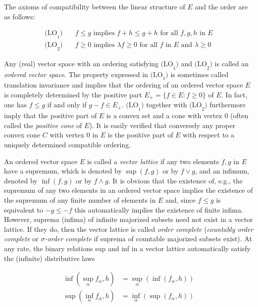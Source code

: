 The axioms of compatibility between the linear structure of $ E $ and the order are as follows:

\begin{align*}
\text{(LO}_1\text{)} & \quad f \leq g \text{ implies } f + h \leq g + h \text{ for all } f, g, h \text{ in } E \\
\text{(LO}_2\text{)} & \quad f \geq 0 \text{ implies } \lambda f \geq 0 \text{ for all } f \text{ in } E \text{ and } \lambda \geq 0
\end{align*}

Any (real) vector space with an ordering satisfying $ \text{(LO}_1\text{)} $ and $ \text{(LO}_2\text{)} $ is called an \emph{ordered vector space}.
The property expressed in $ \text{(LO}_1\text{)} $ is sometimes called translation invariance and implies that the ordering of an ordered vector space $ E $ is completely determined by the positive part $ E_{+} = \{f \in E \colon f \geq 0\} $ of $ E $.
In fact, one has $ f \leq g $ if and only if $ g - f \in E_{+} $.
$ \text{(LO}_1\text{)} $ together with $ \text{(LO}_2\text{)} $ furthermore imply that the positive part of $ E $ is a convex set and a cone with vertex $ 0 $ (often called the \emph{positive cone} of $ E $).
It is easily verified that conversely any proper convex cone $ C $ with vertex $ 0 $ in $ E $ is the positive part of $ E $ with respect to a uniquely determined compatible ordering.

An ordered vector space $ E $ is called a \emph{vector lattice} if any two elements $ f, g $ in $ E $ have a supremum, which is denoted by $ \sup(f,g) $ or by $ f \vee g $, and an infimum, denoted by $ \inf(f,g) $ or by $ f \wedge g $.
It is obvious that the existence of, e.g., the supremum of any two elements in an ordered vector space implies the existence of the supremum of any finite number of elements in $ E $ and, since $ f \leq g $ is equivalent to $ -g \leq -f $ this automatically implies the existence of finite infima.
However, suprema (infima) of infinite majorized subsets need not exist in a vector lattice.
If they do, then the vector lattice is called \emph{order complete} (\emph{countably order complete} or \emph{$ \sigma $-order complete} if suprema of countable majorized subsets exist).
At any rate, the binary relations sup and inf in a vector lattice automatically satisfy the (infinite) distributive laws

\begin{align*}
\inf(\sup_{\alpha}f_{\alpha},h) & = \sup_{\alpha}(\inf(f_{\alpha},h)) \\
\sup(\inf_{\alpha}f_{\alpha},h) & = \inf_{\alpha}(\sup(f_{\alpha},h))
\end{align*}

